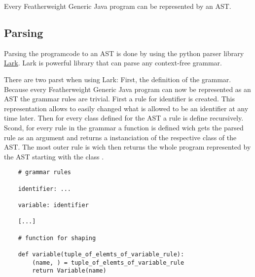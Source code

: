 Every Featherweight Generic Java program can be represented by an AST.

\subsection{Parsing}

Parsing the programcode to an AST is done by using the python parser library \href{https://lark-parser.readthedocs.io/en/stable/}{Lark}.
Lark is powerful library that can parse any context-free grammar.

There are two parst when using Lark:
First, the definition of the grammar.
Because every Featherweight Generic Java program can now be represented as an AST the grammar rules are trivial.
First a rule for identifier is created. This representation allows to easily changed what is allowed to be an identifier at any time later.
Then for every class defined for the AST a rule is define recursively.
Scond, for every rule in the grammar a function is defined wich gets the parsed rule as an argument and returns a instanciation of the respective class of the AST.
The most outer rule is  wich then returns the whole program represented by the AST starting with the class .

\begin{verbatim}
    # grammar rules

    identifier: ...

    variable: identifier

    [...]

    # function for shaping

    def variable(tuple_of_elemts_of_variable_rule):
        (name, ) = tuple_of_elemts_of_variable_rule
        return Variable(name)
\end{verbatim}
